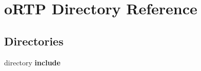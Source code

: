 \section{o\+R\+TP Directory Reference}
\label{dir_56ab9a32050f12272c302af9454f020f}
\subsection*{Directories}
\begin{DoxyCompactItemize}
\item 
directory \textbf{ include}
\end{DoxyCompactItemize}

